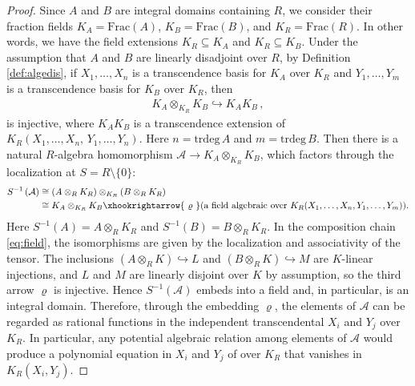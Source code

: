 \documentclass[11pt]{amsart}
\theoremstyle{definition}
\theoremstyle{plain}
\theoremstyle{conclusion}
\begin{document}
 \begin{proof}
     Since $A$ and $B$ are integral domains containing $R$, we consider their fraction fields $K_A = \mathrm{Frac}(A)$, $K_B = \mathrm{Frac}(B)$, and $K_R = \mathrm{Frac}(R)$. In other words, we have the field extensions $K_R \subseteq K_A$ and $K_R \subseteq K_B$. Under the assumption that $A$ and $B$ are linearly disadjoint over $R$, by Definition \ref{def:algedis}, if ${X_1,\ldots,X_n}$ is a transcendence basis for $K_A$ over $K_R$ and ${Y_1,\ldots,Y_m}$ is a transcendence basis for $K_B$ over $K_R$, then \begin{align}
         K_A \otimes_{K_R} K_B \hookrightarrow K_A K_B \,,\label{eq:fraciso}
     \end{align} is injective, where $K_AK_B$ is a transcendence extension of $K_R(X_1,\ldots,X_n,\, Y_1,\ldots,Y_n)$. Here $n = \mathrm{trdeg} \, A $ and $m = \mathrm{trdeg} \, B$. Then there is a natural $R$-algebra homomorphism $\mathcal{A} \to K_A\otimes_{K_R}K_B$, which factors through the localization at $S =R\setminus\{0\}$: \begin{align}
     \nonumber
S^{-1} \left(\mathcal{A}\right) &\cong (A\otimes_R K_R)\otimes_{K_R}(B\otimes_R K_R) \\
&\cong K_A\otimes_{K_R}K_B \xhookrightarrow{ \ \varrho \ } \text{(a field algebraic over $K_R(X_1,\ldots,X_n,Y_1,\ldots,Y_m)$).} \label{eq:field}
\end{align} Here $S^{-1}(A) = A \otimes_R K_R $ and $S^{-1}(B) = B \otimes_R K_R $. In the composition chain \eqref{eq:field}, the isomorphisms are given by the localization and associativity of the tensor. The inclusions  $(A\otimes_R K)\hookrightarrow L$ and $(B\otimes_R K)\hookrightarrow M$ are $K$-linear injections, and $L$ and $M$ are linearly  disjoint over $K$ by assumption, so the third arrow $\varrho$ is injective. Hence $S^{-1}(\mathcal{A})$ embeds into a field and, in particular, is an integral domain.  Therefore, through the embedding $\varrho$, the elements of $\mathcal{A}$ can be regarded as rational functions in the independent transcendental $X_i$ and $Y_j$ over $K_R$. In particular, any potential algebraic relation among elements of $\mathcal{A}$ would produce a polynomial equation in $X_i$ and $Y_j$ of over $K_R$ that vanishes in $K_R(X_i, Y_j)$.


\end{proof}
\end{document}
